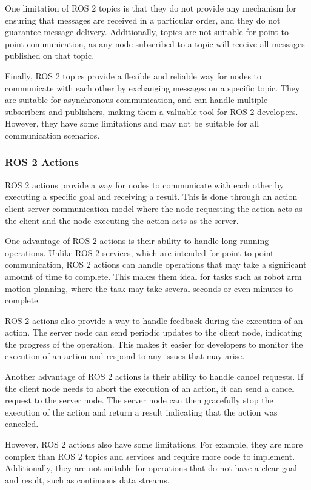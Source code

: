 \documentclass[12pt,oneside]{article}
\begin{document}
One limitation of ROS 2 topics is that they do not provide any mechanism for ensuring that messages are received in a particular order, and they do not guarantee message delivery. Additionally, topics are not suitable for point-to-point communication, as any node subscribed to a topic will receive all messages published on that topic.

Finally, ROS 2 topics provide a flexible and reliable way for nodes to communicate with each other by exchanging messages on a specific topic. They are suitable for asynchronous communication, and can handle multiple subscribers and publishers, making them a valuable tool for ROS 2 developers. However, they have some limitations and may not be suitable for all communication scenarios.

\subsubsection{ROS 2 Actions}\label{ros2-actions}
ROS 2 actions provide a way for nodes to communicate with each other by executing a specific goal and receiving a result. This is done through an action client-server communication model where the node requesting the action acts as the client and the node executing the action acts as the server.

One advantage of ROS 2 actions is their ability to handle long-running operations. Unlike ROS 2 services, which are intended for point-to-point communication, ROS 2 actions can handle operations that may take a significant amount of time to complete. This makes them ideal for tasks such as robot arm motion planning, where the task may take several seconds or even minutes to complete.

ROS 2 actions also provide a way to handle feedback during the execution of an action. The server node can send periodic updates to the client node, indicating the progress of the operation. This makes it easier for developers to monitor the execution of an action and respond to any issues that may arise.

Another advantage of ROS 2 actions is their ability to handle cancel requests. If the client node needs to abort the execution of an action, it can send a cancel request to the server node. The server node can then gracefully stop the execution of the action and return a result indicating that the action was canceled.

However, ROS 2 actions also have some limitations. For example, they are more complex than ROS 2 topics and services and require more code to implement. Additionally, they are not suitable for operations that do not have a clear goal and result, such as continuous data streams.
\end{document}
